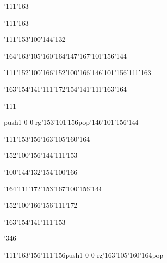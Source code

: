 \null\vfill\ipa\centerline{\enskip\char'111\char'163\enskip\enskip\enskip\enskip\enskip\enskip\enskip\enskip\enskip\enskip}\medskip\centerline{\enskip\enskip\enskip\enskip\enskip\enskip\enskip\enskip\enskip\enskip\enskip\enskip\char'111\char'163}\medskip\centerline{\enskip\enskip\enskip\enskip\enskip\enskip\enskip\enskip\enskip\enskip\enskip\enskip}\medskip\centerline{\enskip\char'111\char'153\enskip\char'100\char'144\char'132\enskip\enskip\enskip\enskip\enskip\enskip\enskip}\medskip\centerline{\enskip\enskip\enskip\enskip\enskip\char'164\char'163\char'105\char'160\char'164\enskip\char'147\char'167\char'101\char'156\char'144\enskip\enskip\enskip}\medskip\centerline{\enskip\char'111\enskip\char'152\char'100\char'166\enskip\char'152\char'100\char'166\enskip\char'146\char'101\char'156\enskip\char'111\char'163}\medskip\centerline{\enskip\char'163\char'154\char'141\char'111\char'172\enskip\enskip\enskip\enskip\char'154\char'141\char'111\char'163\char'164\enskip\enskip\enskip}\medskip\centerline{\enskip\char'111\enskip\enskip\enskip\enskip\enskip\enskip\enskip\enskip\enskip\enskip}\medskip\centerline{\enskip\enskip\enskip\enskip\enskip\enskip\enskip\pdfcolorstack\match push{1 0 0 rg}\char'153\char'101\char'156\pdfcolorstack\match pop{}\enskip\char'146\char'101\char'156\char'144}\medskip\vfill\footline{\hfil\tt\folio\hfil}\eject
\null\vfill\ipa\centerline{\enskip\char'111\char'153\enskip\enskip\enskip\enskip\enskip\char'156\char'163\char'105\char'160\char'164}\medskip\centerline{\enskip\enskip\enskip\enskip\enskip\enskip\enskip\char'152\char'100\char'156\char'144\enskip\char'111\char'153}\medskip\centerline{\enskip\enskip\enskip\enskip\enskip\enskip\enskip\enskip\enskip\enskip\enskip\enskip}\medskip\centerline{\enskip\enskip\enskip\enskip\char'100\char'144\char'132\enskip\enskip\enskip\enskip\char'154\char'100\char'166}\medskip\centerline{\enskip\char'164\char'111\char'172\enskip\enskip\enskip\enskip\enskip\enskip\enskip\char'153\char'167\char'100\char'156\char'144\enskip\enskip\enskip}\medskip\centerline{\enskip\enskip\enskip\enskip\enskip\enskip\enskip\char'152\char'100\char'166\enskip\char'156\char'111\char'172\enskip\enskip\enskip}\medskip\centerline{\enskip\char'163\char'154\char'141\char'111\char'153\enskip\enskip\enskip\enskip\enskip\enskip\enskip\enskip\enskip\enskip\enskip\enskip}\medskip\centerline{\enskip\char'346\enskip\enskip\enskip\enskip\enskip\enskip\enskip\enskip\enskip\enskip}\medskip\centerline{\enskip\char'111\char'163\enskip\enskip\enskip\enskip\char'156\char'111\char'156\enskip\pdfcolorstack\match push{1 0 0 rg}\char'163\char'105\char'160\char'164\pdfcolorstack\match pop{}}\medskip\vfill\footline{\hfil\tt\folio\hfil}\eject\bye